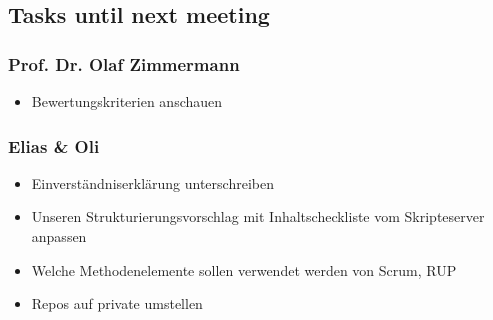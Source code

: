 \hypertarget{tasks-until-next-meeting}{%
\subsection*{Tasks until next meeting}\label{tasks-until-next-meeting}}

\hypertarget{prof.-dr.-olaf-zimmermann}{%
\subsubsection*{Prof. Dr. Olaf
Zimmermann}\label{prof.-dr.-olaf-zimmermann}}

\begin{itemize}

\item
  Bewertungskriterien anschauen
\end{itemize}

\hypertarget{elias-ux5cux26-oli}{%
\subsubsection*{Elias \& Oli}\label{elias-ux5cux26-oli}}

\begin{itemize}

\item
  Einverständniserklärung unterschreiben
\item
  Unseren Strukturierungsvorschlag mit Inhaltscheckliste vom
  Skripteserver anpassen
\item
  Welche Methodenelemente sollen verwendet werden von Scrum, RUP
\item
  Repos auf private umstellen
\end{itemize}